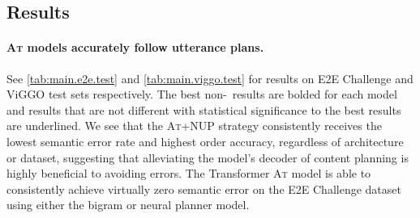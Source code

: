 %
%
%
%




\newcommand{\lsname}[1]{\textsc{#1}}
\newcommand{\lsshort}[1]{\textsc{#1}}
\newcommand{\size}[1]{|#1|}
\newcommand{\lin}{\pi}
\newcommand{\valstr}[1]{\textit{#1}}
\newcommand{\uttstr}[1]{\textit{#1}}
\newcommand{\alignshort}{AT}
\newcommand{\enc}{Enc}
\newcommand{\rep}{h}
\newcommand{\attrval}[2]{#1=#2}
\newcommand{\phraseAug}{+p}
\newcommand{\DA}[1]{\textsc{#1}}










  

\subsection{Results}


\paragraph{\lsshort{At} models accurately follow utterance plans.} See
\autoref{tab:main.e2e.test} and \autoref{tab:main.viggo.test} for results on
E2E Challenge and ViGGO test sets respectively.  
The best non-\Oracle~results are bolded for each model and results
that are not different with statistical significance to the best results
are underlined.
We see that the \lsshort{At+NUP}
strategy consistently receives the lowest semantic error rate and highest 
order accuracy, regardless of
architecture or dataset, suggesting that alleviating the model's decoder of content
planning is highly beneficial to avoiding errors. The Transformer \lsshort{At} model is able to consistently achieve virtually zero semantic error on the E2E Challenge dataset using either
the bigram or neural planner model.

